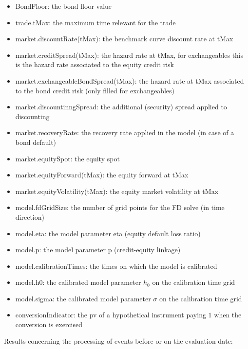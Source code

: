 {\begin{itemize}
\item BondFloor: the bond floor value
\item trade.tMax: the maximum time relevant for the trade
\item market.discountRate(tMax): the benchmark curve discount rate at tMax
\item market.creditSpread(tMax): the hazard rate at tMax, for exchangeables this is the hazard rate associated to the
  equity credit risk
\item market.exchangeableBondSpread(tMax): the hazard rate at tMax associated to the bond credit risk (only filled for
  exchangeables)
\item market.discountinngSpread: the additional (security) spread applied to discounting
\item market.recoveryRate: the recovery rate applied in the model (in case of a bond default)
\item market.equitySpot: the equity spot
\item market.equityForward(tMax): the equity forward at tMax
\item market.equityVolatility(tMax): the equity market volatility at tMax
\item model.fdGridSize: the number of grid points for the FD solve (in time direction)
\item model.eta: the model parameter eta (equity default loss ratio)
\item model.p: the model parameter p (credit-equity linkage)
\item model.calibrationTimes: the times on which the model is calibrated
\item model.h0: the calibrated model parameter $h_0$ on the calibration time grid
\item model.sigma: the calibrated model parameter $\sigma$ on the calibration time grid
\item conversionIndicator: the pv of a hypothetical instrument paying $1$ when the conversion is exercised
\end{itemize}

Results concerning the processing of events before or on the evaluation date:

}
